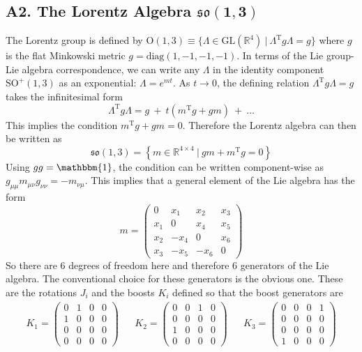 \documentclass[onecolumn]{gwclass}
\renewcommand{\t}[1]{\text{#1}}
\begin{document}
\subsection{A2. The Lorentz Algebra $\boldsymbol{\mathfrak{so}(1,3)}$}
The Lorentz group is defined by $\t{O}(1,3)\equiv \{ \Lambda \in \t{GL}(\mathbb{R}^4)\:|\: \Lambda^\t{T}g\Lambda = g \}$ where $g$ is the flat Minkowski metric $g=\t{diag}(1,-1,-1,-1)$. In terms of the Lie group-Lie algebra correspondence, we can write any $\Lambda$ in the identity component $\t{SO}^+(1,3)$ as an exponential: $\Lambda = e^{mt}$. As $t\to 0$, the defining relation $\Lambda^\t{T}g\Lambda = g$ takes the infinitesimal form
$$ \Lambda^\t{T}g\Lambda = g \:+\: t(m^\t{T}g + gm)  \:+\: \dots  $$
This implies the condition $m^\t{T}g + gm = 0$. Therefore the Lorentz algebra can then be written as
$$ \mathfrak{so}(1,3) = \left\{ m\in\mathbb{R}^{4\times 4} \:|\: gm +m^\t{T}g=0 \right\}$$
Using $gg=\mathbbm{1}$, the condition can be written component-wise as $g_{\mu\mu}m_{\mu\nu}g_{\nu\nu}=-m_{\nu\mu}$. This implies that a general element of the Lie algebra has the form
$$ m = \begin{pmatrix}
	0 & x_1 & x_2 & x_3 \\
	x_1 & 0 & x_4 & x_5 \\
	x_2 & -x_4 & 0 & x_6 \\
	x_3 & -x_5 & -x_6 & 0
\end{pmatrix} $$
So there are 6 degrees of freedom here and therefore 6 generators of the Lie algebra. The conventional choice for these generators is the obvious one. These are the rotations $J_i$ and the boosts $K_i$ defined so that the boost generators are
\begin{align*}
	K_1 = \begin{pmatrix}
		0&1&0&0\\
		1&0&0&0\\
		0&0&0&0\\
		0&0&0&0
	\end{pmatrix} && K_2 =\begin{pmatrix}
	0&0&1&0\\
	0&0&0&0\\
	1&0&0&0\\
	0&0&0&0
\end{pmatrix} && K_3 = \begin{pmatrix}
0&0&0&1\\
0&0&0&0\\
0&0&0&0\\
1&0&0&0
\end{pmatrix} 
\end{align*}
\end{document}
